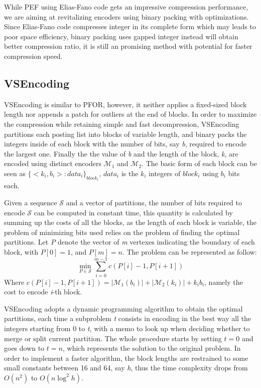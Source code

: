 \documentclass[runningheads,a4paper]{llncs}
\begin{document}
While PEF using Elias-Fano code gets an impressive compression performance, we are aiming at revitalizing encoders using binary packing with optimizations. Since Elias-Fano code compresses integer in its complete form which may leads to poor space efficiency, binary packing uses gapped integer instead will obtain better compression ratio, it is still an promising method with potential for faster compression speed.

\subsection{VSEncoding}

VSEncoding is similar to PFOR, however, it neither applies a fixed-sized block length nor appends a patch for outliers at the end of blocks. In order to maximize the compression while retaining simple and fast decompression, VSEncoding partitions each posting list into blocks of variable length, and binary packs the integers inside of each block with the number of bits, say \textit{b}, required to encode the largest one. Finally the the value of \textit{b} and the length of the block, \textit{k}, are encoded using distinct encoders $ \mathcal{M}_{1} $ and $ \mathcal{M}_{2} $. The basic form of each block can be seen as $ \{<k_{i},b_{i}>: data_{i}\}_{block_{i}} $, $ data_{i} $ is the $ k_{i} $ integers of $ block_{i} $ using $ b_{i} $ bits each.

Given a sequence $\mathcal{S}$ and a vector of partitions, the number of bits required to encode $\mathcal{S}$ can be computed in constant time, this quantity is calculated by summing up the costs of all the blocks, as the length of each block is variable, the problem of minimizing bits used relies on the problem of finding the optimal partitions. Let \textit{P} denote the vector of \textit{m} vertexes indicating the boundary of each block, with $ P\left[ 0 \right] = 1 $, and $ P\left[ m \right] = n $. The problem can be represented as follow:
\begin{equation*}
\min_{P\in\mathcal{S}}\sum_{i=0}^{m-1}c\left(P\left[i\right]-1,P\left[i+1\right]\right )
\end{equation*}
Where $c\left(P\left[i\right]-1,P\left[i+1\right]\right )=|\mathcal{M}_{1}\left( b_{i}\right) |+|\mathcal{M}_{2}\left( k_{i}\right) |+k_{i}b_{i}$, namely the cost to encode \textit{i}-th block.

VSEncoding adopts a dynamic programming algorithm to obtain the optimal partitions, each time a subproblem \textit{t} consists in encoding in the best way all the integers starting from 0 to \textit{t}, with a memo to look up when deciding whether to merge or split current partition. The whole procedure starts by setting $t = 0$ and goes down to $t = n$, which represents the solution to the original problem. In order to implement a faster algorithm, the block lengths are restrained to some small constants between 16 and 64, say \textit{h}, thus the time complexity drops from $ O\left(n^{2}\right) $ to $ O\left(n\log^{2}h\right) $.
\end{document}
